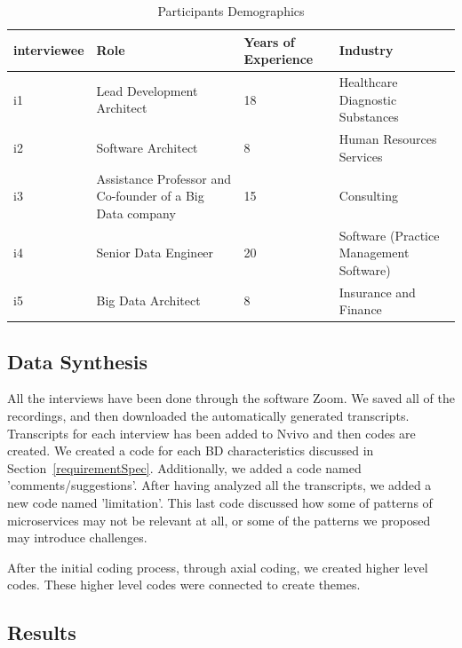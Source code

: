 \documentclass{bmcart}
\begin{document}
\begin{table}[h]
  \renewcommand{\arraystretch}{1.5}
  \caption[]{Participants Demographics}
  \begin{tabular}{|p{1.4cm}|p{4cm}|p{1.5cm}|p{2.5cm}|}
      \hline
      interviewee & Role & Years of Experience  & Industry \\  

      \hline
      i1 & Lead Development Architect & 18 &  Healthcare Diagnostic Substances \\   
      \hline
      i2 & Software Architect & 8 &  Human Resources Services  \\   
      \hline
      i3 & Assistance Professor and Co-founder of a Big Data company & 15 &  Consulting \\   
      \hline
      i4 & Senior Data Engineer & 20 &  Software (Practice Management Software) \\   
      \hline
      i5 & Big Data Architect & 8 &  Insurance and Finance \\   
      \hline
      
  \end{tabular}
  \label{interviewees}
\end{table}


\subsection{Data Synthesis}

All the interviews have been done through the software Zoom. We saved all of the recordings, and then downloaded the automatically generated transcripts. Transcripts for each interview has been added to Nvivo and then codes are created. We created a code for each BD characteristics discussed in Section~\ref{requirementSpec}. Additionally, we added a code named 'comments/suggestions'. After having analyzed all the transcripts, we added a new code named 'limitation'. This last code discussed how some of patterns of microservices may not be relevant at all, or some of the patterns we proposed may introduce challenges. 

After the initial coding process, through axial coding, we created higher level codes. These higher level codes were connected to create themes. 


\subsection{Results}
\end{document}
